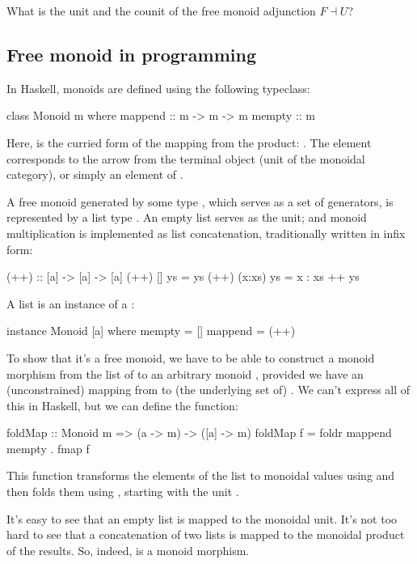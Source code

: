 \documentclass[DaoFP]{subfiles}
\begin{document}
\begin{exercise}
What is the unit and the counit of the free monoid adjunction $F \dashv U$?
\end{exercise}

\subsection{Free monoid in programming}

In Haskell, monoids are defined using the following typeclass:
\begin{haskell}
class Monoid m where
  mappend :: m -> m -> m
  mempty  :: m
\end{haskell}
Here,  is the curried form of the mapping from the product: . The  element corresponds to the arrow from the terminal object (unit of the monoidal category), or simply an element of . 

A free monoid generated by some type , which serves as a set of generators, is represented by a list type \hask{[a]}. An empty list serves as the unit; and monoid multiplication is implemented as list concatenation, traditionally written in infix form:
\begin{haskell}
(++) :: [a] -> [a] -> [a]
(++) []     ys = ys
(++) (x:xs) ys = x : xs ++ ys
\end{haskell}
A list is an instance of a :
\begin{haskell}
instance Monoid [a] where
  mempty = []
  mappend = (++)
\end{haskell}

To show that it's a free monoid, we have to be able to construct a monoid morphism from the list of  to an arbitrary monoid , provided we have an (unconstrained) mapping from  to (the underlying set of) . We can't express all of this in Haskell, but we can define the function:
\begin{haskell}
foldMap :: Monoid m => (a -> m) -> ([a] -> m)
foldMap f = foldr mappend mempty . fmap f
\end{haskell}
This function transforms the elements of the list to monoidal values using  and then folds them using , starting with the unit . 

It's easy to see that an empty list is mapped to the monoidal unit. It's not too hard to see that a concatenation of two lists is mapped to the monoidal product of the results. So, indeed,  is a monoid morphism. 
\end{document}
